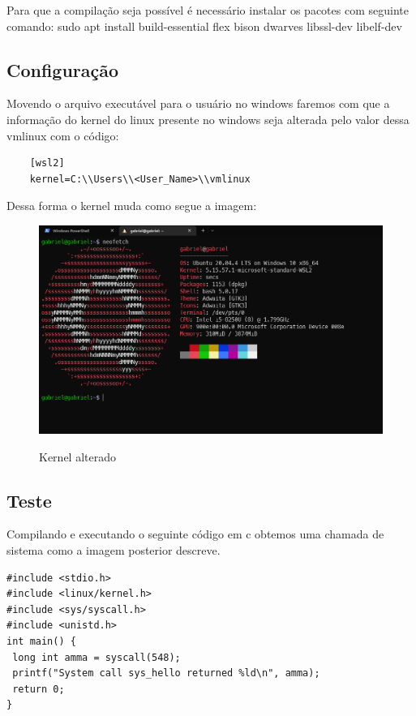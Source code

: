 \documentclass[a4paper, 12pt]{article}
\begin{document}
Para que a compilação seja possível é necessário instalar os pacotes com seguinte comando: sudo apt install build-essential flex bison dwarves libssl-dev libelf-dev

\newpage

\subsection{Configuração}

Movendo o arquivo executável para o usuário no windows faremos com que a informação do kernel do linux presente no windows seja alterada pelo valor dessa vmlinux com o código:

\begin{lstlisting} 
    [wsl2]
    kernel=C:\\Users\\<User_Name>\\vmlinux 
\end{lstlisting}

Dessa forma o kernel muda como segue a imagem:

\newpage

\begin{figure}[!ht]
\centering 
\includegraphics[width=13.5cm]{other-kernel.png}
\label{figura:other-kernel}
\caption{Kernel alterado}
\end{figure}

\subsection{Teste}

Compilando e executando o seguinte código em c obtemos uma chamada de sistema como a imagem posterior descreve.

\begin{lstlisting} 
#include <stdio.h>
#include <linux/kernel.h>
#include <sys/syscall.h>
#include <unistd.h>
int main() {
 long int amma = syscall(548);
 printf("System call sys_hello returned %ld\n", amma);
 return 0;
}
\end{lstlisting}
\end{document}
